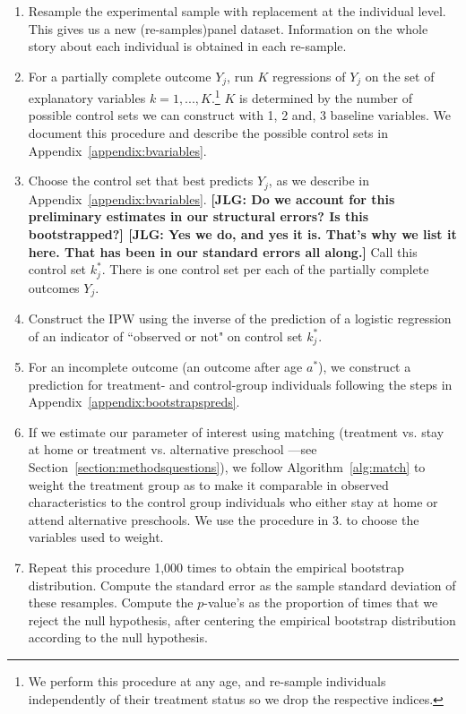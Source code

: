 \begin{enumerate}

\item Resample the experimental sample with replacement at the individual level. This gives us a new (re-samples)panel dataset. Information on the whole story about each individual is obtained in each re-sample.

\item For a partially complete outcome $Y_{j}$, run $K$ regressions of $Y_{j}$ on the set of explanatory variables $k = 1,..., K$.\footnote{We perform this procedure at any age, and re-sample individuals independently of their treatment status so we drop the respective indices.} $K$ is determined by the number of possible control sets we can construct with 1, 2 and, 3 baseline variables. We document this procedure and describe the possible control sets in Appendix~\ref{appendix:bvariables}.

\item Choose the control set that best predicts $Y_{j}$, as we describe in Appendix~\ref{appendix:bvariables}. \textbf{[JLG: Do we account for this preliminary estimates in our structural errors? Is this bootstrapped?] [JLG: Yes we do, and yes it is. That's why we list it here. That has been in our standard errors all along.]} Call this control set $k^*_{j}$. There is one control set per each of the partially complete outcomes $Y_{j}$.

\item Construct the IPW using the inverse of the prediction of  a logistic regression of an indicator of ``observed or not" on control set $k^*_{j}$.

\item For an incomplete outcome (an outcome after age $a^*$), we construct a prediction for treatment- and control-group individuals following the steps in Appendix~\ref{appendix:bootstrapspreds}.

\item If we estimate our parameter of interest using  matching (treatment vs. stay at home or treatment vs. alternative preschool ---see Section~\ref{section:methodsquestions}), we follow Algorithm~\ref{alg:match} to weight the treatment group as to make it comparable in observed characteristics to the control group individuals who either stay at home or attend alternative preschools. We use the procedure in 3. to choose the variables used to weight.

\item Repeat this procedure 1,000 times to obtain the empirical bootstrap distribution. Compute the standard error as the sample standard deviation of these resamples. Compute the $p$-value's as the proportion of times that we reject the null hypothesis, after centering the empirical bootstrap distribution according to the null hypothesis.

\end{enumerate}

